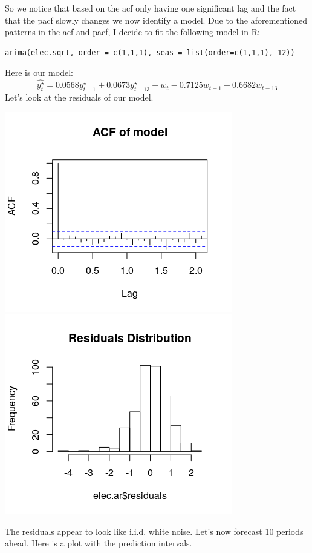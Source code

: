 \documentclass[11pt]{article}
\begin{document}
So we notice that based on the acf only having one significant lag and the fact that the pacf slowly changes we now identify a model. Due to the aforementioned patterns in the acf and pacf, I decide to fit the following model in R: 
\begin{center}
\begin{lstlisting}
arima(elec.sqrt, order = c(1,1,1), seas = list(order=c(1,1,1), 12))
\end{lstlisting}
\end{center}

Here is our model:
$$ \hat{y_t^\star} = 0.0568y_{t-1}^\star + 0.0673y_{t-13}^\star + w_t - 0.7125w_{t-1} - 0.6682w_{t-13}$$
Let's look at the residuals of our model.
\begin{center}
\includegraphics[scale=1]{4E}
\includegraphics[scale=1]{4F}
\end{center}
The residuals appear to look like i.i.d. white noise. Let's now forecast 10 periods ahead. Here is a plot with the prediction intervals.
\end{document}
